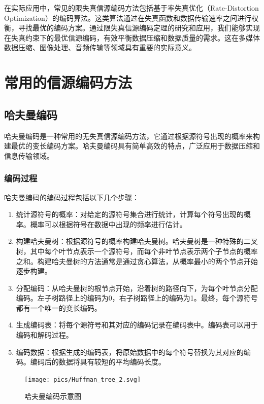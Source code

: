 \begin{multicols}{2}
在实际应用中，常见的限失真信源编码方法包括基于率失真优化（Rate-Distortion Optimization）的编码算法。这类算法通过在失真函数和数据传输速率之间进行权衡，寻找最优的编码方案。通过限失真信源编码定理的研究和应用，我们能够实现在失真约束下的最优信源编码，有效平衡数据压缩和数据质量的需求。这在多媒体数据压缩、图像处理、音频传输等领域具有重要的实际意义。

\section{常用的信源编码方法}
\subsection{哈夫曼编码}
哈夫曼编码是一种常用的无失真信源编码方法，它通过根据源符号出现的概率来构建最优的变长编码方案。哈夫曼编码具有简单高效的特点，广泛应用于数据压缩和信息传输领域。

\subsubsection{编码过程}

哈夫曼编码的编码过程包括以下几个步骤：
\begin{enumerate}
	\item[(1)] 统计源符号的概率：对给定的源符号集合进行统计，计算每个符号出现的概率。概率可以根据符号在数据中出现的频率进行估计。
	
	\item[(2)] 构建哈夫曼树：根据源符号的概率构建哈夫曼树。哈夫曼树是一种特殊的二叉树，其中每个叶节点表示一个源符号，而每个非叶节点表示两个子节点的概率之和。构建哈夫曼树的方法通常是通过贪心算法，从概率最小的两个节点开始逐步构建。
	
	\item[(3)] 分配编码：从哈夫曼树的根节点开始，沿着树的路径向下，为每个叶节点分配编码。左子树路径上的编码为0，右子树路径上的编码为1。最终，每个源符号都有一个唯一的变长编码。
	
	\item[(4)] 生成编码表：将每个源符号和其对应的编码记录在编码表中。编码表可以用于编码和解码过程。
	
	\item [(5)] 编码数据：根据生成的编码表，将原始数据中的每个符号替换为其对应的编码。编码后的数据将具有较短的平均编码长度。
\end{enumerate}
\begin{figure}[H]
	\centering
	\texttt{[image: pics/Huffman\_tree\_2.svg]}
	\caption{哈夫曼编码示意图}
	\label{fig:huffmantree2}
\end{figure}


\end{multicols}

